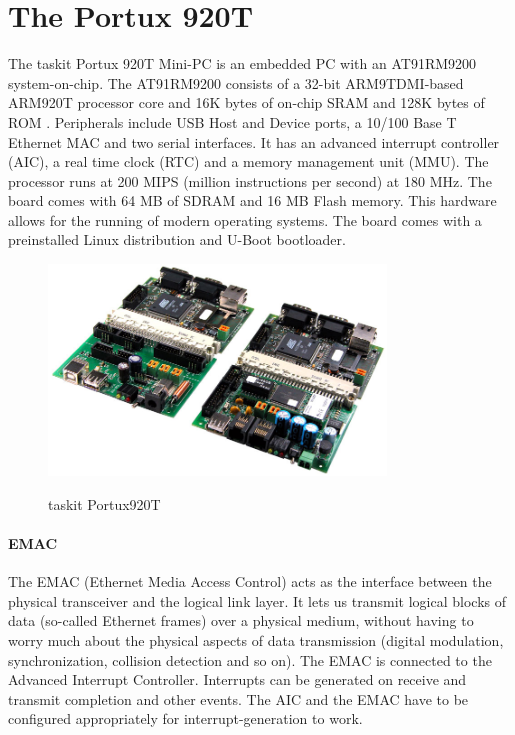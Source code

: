 \documentclass[11pt,twoside,abstract,notitlepage]{scrreprt}
\begin{document}
\section{The Portux 920T} 
The taskit Portux 920T Mini-PC is an embedded PC with an AT91RM9200 system-on-chip. The AT91RM9200 consists of a 32-bit ARM9TDMI-based ARM920T processor core and 16K bytes of on-chip SRAM and 128K bytes of ROM \cite{atmel}. Peripherals include USB Host and Device ports, a 10/100 Base T Ethernet MAC and two serial interfaces. It has an advanced interrupt controller (AIC), a real time clock (RTC) and a memory management unit (MMU). The processor runs at 200 MIPS (million instructions per second) at 180 MHz. The board comes with 64 MB of SDRAM and 16 MB Flash memory. This hardware allows for the running of modern operating systems. The board comes with a preinstalled Linux distribution and U-Boot bootloader. 

\begin{figure}
\normalsize
\centerline{\includegraphics[width=0.8\textwidth]{images/portuxminipc.jpg}
\label{fig:portuxpicture}}
\caption{taskit Portux920T}
\end{figure}

\paragraph{EMAC} The EMAC (Ethernet Media Access Control) acts as the interface between the physical transceiver and the logical link layer. It lets us transmit logical blocks of data (so-called Ethernet frames) over a physical medium, without having to worry much about the physical aspects of data transmission (digital modulation, synchronization, collision detection and so on). The EMAC is connected to the Advanced Interrupt Controller. Interrupts can be generated on receive and transmit completion and other events. The AIC and the EMAC have to be configured appropriately for interrupt-generation to work.
\end{document}

